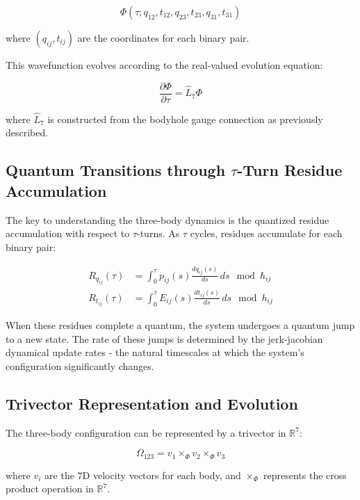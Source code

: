 \documentclass{article}
\begin{document}
\begin{equation}
\Phi(\tau; q_{12}, t_{12}, q_{23}, t_{23}, q_{31}, t_{31})
\end{equation}

where $(q_{ij}, t_{ij})$ are the coordinates for each binary pair.

This wavefunction evolves according to the real-valued evolution equation:

\begin{equation}
\frac{\partial \Phi}{\partial \tau} = \hat{L}_7 \Phi
\end{equation}

where $\hat{L}_7$ is constructed from the bodyhole gauge connection as previously described.

\subsection{Quantum Transitions through $\tau$-Turn Residue Accumulation}

The key to understanding the three-body dynamics is the quantized residue accumulation with respect to $\tau$-turns. As $\tau$ cycles, residues accumulate for each binary pair:

\begin{align}
R_{q_{ij}}(\tau) &= \int_0^\tau p_{ij}(s) \frac{dq_{ij}(s)}{ds} \, ds \mod \hbar_{ij} \\
R_{t_{ij}}(\tau) &= \int_0^\tau E_{ij}(s) \frac{dt_{ij}(s)}{ds} \, ds \mod h_{ij}
\end{align}

When these residues complete a quantum, the system undergoes a quantum jump to a new state. The rate of these jumps is determined by the jerk-jacobian dynamical update rates - the natural timescales at which the system's configuration significantly changes.

\subsection{Trivector Representation and Evolution}

The three-body configuration can be represented by a trivector in $\mathbb{R}^7$:

\begin{equation}
\Omega_{123} = v_1 \times_\Phi v_2 \times_\Phi v_3
\end{equation}

where $v_i$ are the 7D velocity vectors for each body, and $\times_\Phi$ represents the cross product operation in $\mathbb{R}^7$.
\end{document}

